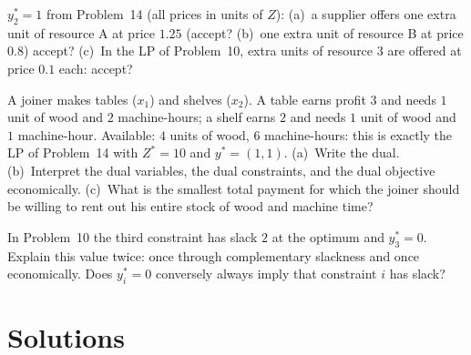 \begin{problems}
        $y_{2}^{*}=1$ from Problem~14 (all prices in units of $Z$):
        (a)~a supplier offers one extra unit of resource A at price
        $1.25$ (accept?
        (b)~one extra unit of resource B at price $0.8$) accept?
        (c)~In the LP of Problem~10, extra units of resource 3 are offered
        at price $0.1$ each: accept?
  \item A joiner makes tables ($x_{1}$) and shelves ($x_{2}$). A table
        earns profit $3$ and needs $1$ unit of wood and $2$ machine-hours;
        a shelf earns $2$ and needs $1$ unit of wood and $1$ machine-hour.
        Available: $4$ units of wood, $6$ machine-hours: this is exactly
        the LP of Problem~14 with $Z^{*}=10$ and $y^{*}=(1,1)$.
        (a)~Write the dual.
        (b)~Interpret the dual variables, the dual constraints, and the
        dual objective economically.
        (c)~What is the smallest total payment for which the joiner should
        be willing to rent out his entire stock of wood and machine time?
  \item In Problem~10 the third constraint has slack $2$ at the optimum
        and $y_{3}^{*}=0$. Explain this value twice: once through
        complementary slackness and once economically. Does
        $y_{i}^{*}=0$ conversely always imply that constraint $i$ has
        slack?
\end{problems}

\section{Solutions}

